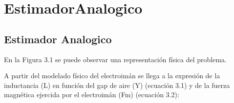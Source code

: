 \chapter{EstimadorAnalogico}  \label{cap:Estimador Analogico}

\section{Estimador Analogico}

En la Figura 3.1 se puede observar una representación física del problema.


A partir del modelado físico del electroimán se llega a la expresión de la inductancia (L) en función del gap de aire (Y) (ecuación 3.1) y de la fuerza magnética ejercida por el electroimán (Fm) (ecuación 3.2):


